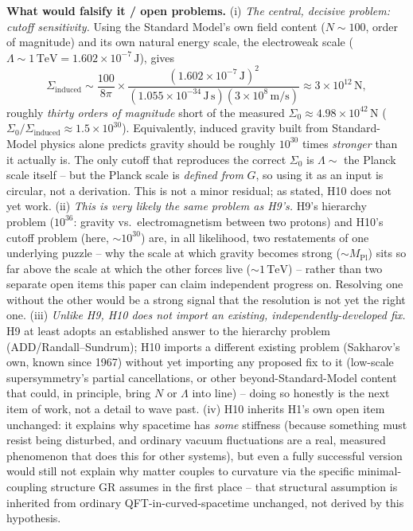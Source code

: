 \documentclass[12pt, a4paper]{article}
\begin{document}
\textbf{What would falsify it / open problems.}
(i) \emph{The central, decisive problem: cutoff sensitivity.} Using
the Standard Model's own field content ($N\sim100$, order of
magnitude) and its own natural energy scale, the electroweak scale
($\Lambda\sim1\,\mathrm{TeV}=1.602\times10^{-7}\,\mathrm{J}$), gives
\[
\Sigma_{\text{induced}} \sim \frac{100}{8\pi}\times
\frac{(1.602\times10^{-7}\,\mathrm{J})^2}
{(1.055\times10^{-34}\,\mathrm{J\,s})(3\times10^8\,\mathrm{m/s})}
\approx 3\times10^{12}\,\mathrm{N},
\]
roughly \emph{thirty orders of magnitude} short of the measured
$\Sigma_0\approx4.98\times10^{42}\,\mathrm{N}$
($\Sigma_0/\Sigma_{\text{induced}}\approx1.5\times10^{30}$).
Equivalently, induced gravity built from Standard-Model physics alone
predicts gravity should be roughly $10^{30}$ times \emph{stronger}
than it actually is. The only cutoff that reproduces the correct
$\Sigma_0$ is $\Lambda\sim$ the Planck scale itself -- but the Planck
scale is \emph{defined from} $G$, so using it as an input is
circular, not a derivation. This is not a minor residual; as stated,
H10 does not yet work. (ii) \emph{This is very likely the same
problem as H9's.} H9's hierarchy problem ($10^{36}$: gravity vs.\
electromagnetism between two protons) and H10's cutoff problem (here,
$\sim10^{30}$) are, in all likelihood, two restatements of one
underlying puzzle -- why the scale at which gravity becomes strong
($\sim M_{\mathrm{Pl}}$) sits so far above the scale at which the
other forces live ($\sim1\,\mathrm{TeV}$) -- rather than two separate
open items this paper can claim independent progress on. Resolving
one without the other would be a strong signal that the resolution is
not yet the right one. (iii) \emph{Unlike H9, H10 does not import an
existing, independently-developed fix.} H9 at least adopts an
established answer to the hierarchy problem (ADD/Randall--Sundrum);
H10 imports a different existing problem (Sakharov's own, known since
1967) without yet importing any proposed fix to it (low-scale
supersymmetry's partial cancellations, or other beyond-Standard-Model
content that could, in principle, bring $N$ or $\Lambda$ into line) --
doing so honestly is the next item of work, not a detail to wave
past. (iv) H10 inherits H1's own open item unchanged: it explains why
spacetime has \emph{some} stiffness (because something must resist
being disturbed, and ordinary vacuum fluctuations are a real,
measured phenomenon that does this for other systems), but even a
fully successful version would still not explain why matter couples
to curvature via the specific minimal-coupling structure GR assumes
in the first place -- that structural assumption is inherited from
ordinary QFT-in-curved-spacetime unchanged, not derived by this
hypothesis.
\end{document}
